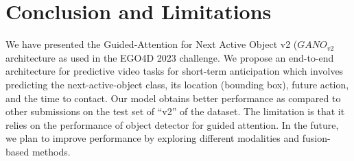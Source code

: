 \documentclass[10pt,twocolumn,letterpaper]{article}
\begin{document}
\section{Conclusion and Limitations}
\label{sec:conclusion}
We have presented the Guided-Attention for Next Active Object v2 ($GANO_{v2}$ architecture as used in the EGO4D 2023 challenge. We propose an end-to-end architecture for predictive video tasks for short-term anticipation which involves predicting the next-active-object class, its location (bounding box), future action, and the time to contact. Our model obtains better performance as compared to other submissions on the test set of ``v2'' of the dataset. The limitation is that it relies on the performance of object detector for guided attention. In the future, we plan to improve performance by exploring different modalities and fusion-based methods.

\newpage


\end{document}
